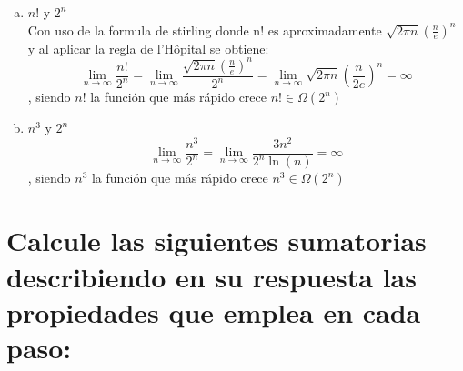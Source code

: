 \documentclass{article}
\begin{document}
\begin{enumerate}[(a)]
\item $n!$ y $2^{n}$ \\ Con uso de la formula de stirling donde n! es aproximadamente $\sqrt{2\pi n}(\frac{n}{e})^n$ y al aplicar la regla de l'Hôpital se obtiene:
  \[ \lim_{n\to\infty} \frac{n!}{2^{n}} = \lim_{n\to\infty} \frac{\sqrt{2\pi n} (\frac{n}{e})^n}{2^{n}} = \lim_{n\to\infty} \sqrt{2\pi n}(\frac{n}{2e})^{n} = \infty\], siendo $n!$ la función que más rápido crece $n! \in \Omega(2^{n})$
\item $n^{3}$ y $2^{n}$\\
  \[ \lim_{n\to\infty} \frac{n^{3}}{2^{n}} = \lim_{n\to\infty} \frac{3n^2}{2^{n}\ln (n)} = \infty \], siendo $n^{3}$ la función que más rápido crece $n^{3} \in \Omega (2^{n})$
\end{enumerate}

\newpage
\section{Calcule las siguientes sumatorias describiendo en su respuesta las propiedades que emplea en cada paso:}
\end{document}
